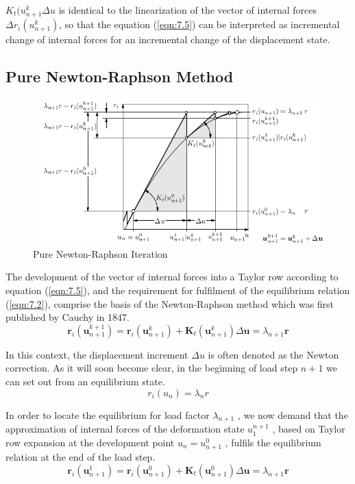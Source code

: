  $K_t (u^ k_{n+1} \Delta u$ is identical to the linearization of the vector of
internal forces $\Delta r_i(u^k_{n+1})$, so that the equation (\ref{eqn:7.5}) can be interpreted as incremental change
of internal forces for an incremental change of the displacement state.
\subsection{Pure Newton-Raphson Method}
\noindent
\begin{figure}[H]
    \centering
    \includegraphics[scale=0.6]{Figure2/Chap3/Pure Newton-Raphson.png}
    \caption{Pure Newton-Raphson Iteration}
    \label{fig:7.2}
\end{figure}
The development of the vector of internal forces into a Taylor row according to equation (\ref{eqn:7.5}),
and the requirement for fulfilment of the equilibrium relation (\ref{eqn:7.2}), comprise the basis of the
Newton-Raphson method which was first published by Cauchy in 1847.
\begin{equation}
 \boldsymbol{r}_{i}\left(\boldsymbol{u}_{n+1}^{k+1}\right)=\boldsymbol{r}_{i}\left(\boldsymbol{u}_{n+1}^{k}\right)+\mathbf{K}_{t}\left(\boldsymbol{u}_{n+1}^{k}\right) \Delta \boldsymbol{u}=\lambda_{n+1} \boldsymbol{r} 
 \label{eqn:7.8} 
\end{equation}

In this context, the displacement increment $\Delta u$ is often denoted as the Newton correction. As
it will soon become clear, in the beginning of load step $n + 1$ we can set out from an equilibrium
state.
\begin{equation}
    r_i(u_n)=\lambda _nr
    \label{eqn:7.9}
\end{equation}

In order to locate the equilibrium for load factor $\lambda_{n+1}$ , we now demand that the approximation of internal forces of the deformation state $u_1^{n+1}$ , based on Taylor row expansion at the
development point $u_n=u^0_{n+1}$ , fulfils the equilibrium relation at the end of the load step.
\begin{equation}
 \boldsymbol{r}_{i}\left(\boldsymbol{u}_{n+1}^{1}\right)=\boldsymbol{r}_{i}\left(\boldsymbol{u}_{n+1}^{0}\right)+\mathbf{K}_{t}\left(\boldsymbol{u}_{n+1}^{0}\right) \Delta \boldsymbol{u}=\lambda_{n+1} \boldsymbol{r} 
 \label{eqn:7.10} 
\end{equation}

